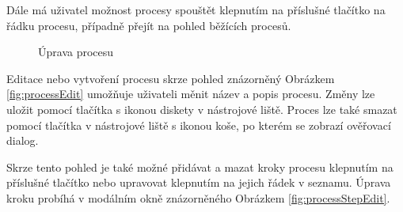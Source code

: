\documentclass[12pt,a4paper]{article}
\begin{document}
Dále má uživatel možnost procesy spouštět klepnutím na příslušné tlačítko na řádku procesu, případně přejít na pohled běžících procesů.
\newpage
\begin{figure}
	\centering
\caption{Úprava procesu}
\end{figure}
Editace nebo vytvoření procesu skrze pohled znázorněný Obrázkem \ref{fig:processEdit} umožňuje uživateli měnit název a popis procesu. Změny lze uložit pomocí tlačítka s ikonou diskety v nástrojové liště. Proces lze také smazat pomocí tlačítka v nástrojové liště s ikonou koše, po kterém se zobrazí ověřovací dialog.

Skrze tento pohled je také možné přidávat a mazat kroky procesu klepnutím na příslušné tlačítko nebo upravovat klepnutím na jejich řádek v seznamu. Úprava kroku probíhá v modálním okně znázorněného Obrázkem \ref{fig:processStepEdit}.
\end{document}
